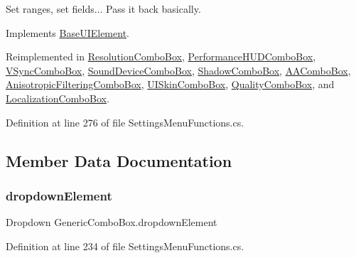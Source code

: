 Set ranges, set fields... Pass it back basically. 



Implements \hyperlink{class_base_u_i_element_a9a0aa6ac0b194f90e092b372adce4e30}{Base\+U\+I\+Element}.



Reimplemented in \hyperlink{class_resolution_combo_box_a226f4bbab7c3729cb67a681b4adaec3d}{Resolution\+Combo\+Box}, \hyperlink{class_performance_h_u_d_combo_box_a4d2e3c3bb7815cb0274a0d890af92cd0}{Performance\+H\+U\+D\+Combo\+Box}, \hyperlink{class_v_sync_combo_box_a6de5084b8e4b47a434de53bab6650d82}{V\+Sync\+Combo\+Box}, \hyperlink{class_sound_device_combo_box_a20c9540411ea0e9248b54f5a54725290}{Sound\+Device\+Combo\+Box}, \hyperlink{class_shadow_combo_box_ae74c360bfe5007aa56efd66e1d016a74}{Shadow\+Combo\+Box}, \hyperlink{class_a_a_combo_box_a24e6de36b3019dd2a428837d6fab86b8}{A\+A\+Combo\+Box}, \hyperlink{class_anisotropic_filtering_combo_box_a3a3182ef43ee5c56158e41c750329ab5}{Anisotropic\+Filtering\+Combo\+Box}, \hyperlink{class_u_i_skin_combo_box_a4d7b16b8368b3cc075fa026a6e60af88}{U\+I\+Skin\+Combo\+Box}, \hyperlink{class_quality_combo_box_a8f6e77ad23e7e937c023d4ad4f9aeaa4}{Quality\+Combo\+Box}, and \hyperlink{class_localization_combo_box_ab676d6d7fe3c9c9d55259a8aec060622}{Localization\+Combo\+Box}.



Definition at line 276 of file Settings\+Menu\+Functions.\+cs.



\subsection{Member Data Documentation}
\mbox{\label{class_generic_combo_box_a9bdea08b062f9caecedcfc173197e310}} 
\subsubsection{\texorpdfstring{dropdown\+Element}{dropdownElement}}
{\footnotesize\ttfamily Dropdown Generic\+Combo\+Box.\+dropdown\+Element\hspace{0.3cm}{\ttfamily [protected]}}



Definition at line 234 of file Settings\+Menu\+Functions.\+cs.

